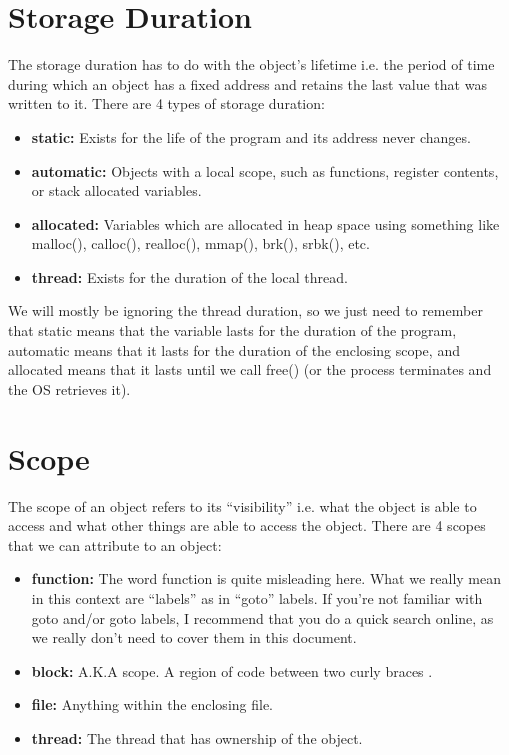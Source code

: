 \documentclass{article}
\begin{document}
\section{Storage Duration}

The storage duration has to do with the object’s lifetime i.e. the period of time during which an object has
a fixed address and retains the last value that was written to it. There are 4 types of storage duration:

\begin{itemize}

\item{%
    \textbf{static:} Exists for the life of the program and its address never changes.
}

\item{%
    \textbf{automatic:} Objects with a local scope, such as functions, register contents, or stack allocated
    variables.
}

\item{%
    \textbf{allocated:} Variables which are allocated in heap space using something like malloc(), calloc(),
    realloc(), mmap(), brk(), srbk(), etc.
}

\item{%
    \textbf{thread:} Exists for the duration of the local thread.
}

\end{itemize}

We will mostly be ignoring the thread duration, so we just need to remember that static means that the
variable lasts for the duration of the program, automatic means that it lasts for the duration of the
enclosing scope, and allocated means that it lasts until we call free() (or the process terminates and the OS
retrieves it).

\section{Scope}

The scope of an object refers to its “visibility” i.e. what the object is able to access and what other
things are able to access the object. There are 4 scopes that we can attribute to an object:

\begin{itemize}

\item{%
    \textbf{function:} The word function is quite misleading here. What we really mean in this context are
    “labels” as in “goto” labels. If you’re not familiar with goto and/or goto labels, I recommend that you
    do a quick search online, as we really don’t need to cover them in this document.
}

\item{%
    \textbf{block:} A.K.A scope. A region of code between two curly braces { }.
}

\item{%
    \textbf{file:} Anything within the enclosing file.
}

\item{%
    \textbf{thread:} The thread that has ownership of the object.
}

\end{itemize}
\end{document}
